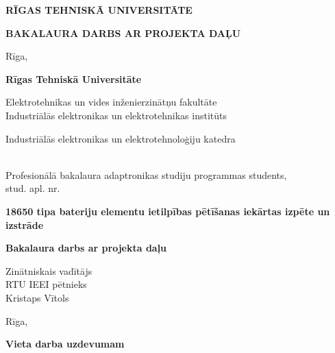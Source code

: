 \documentclass[12pt,fleqn,titlepage,oneside]{article}
\begin{document}
\begin{titlepage}
	\centering
	\doublespacing
	
	{\Large\MakeUppercase{\textbf{Rīgas Tehniskā Universitāte}}\par}
	
	\vspace*{\fill}
	
	{\Huge\MakeUppercase{\textbf{Bakalaura darbs ar projekta daļu}}\par}
	
	\vspace*{\fill}
	
	{\Large Rīga, \the\year}
\end{titlepage}

\begin{titlepage}
	\centering
	\doublespacing
	{\Large \textbf{Rīgas Tehniskā Universitāte}}
	
	{Elektrotehnikas un vides inženierzinātņu fakultāte\\}
	{Industriālās elektronikas un elektrotehnikas institūts\\}
	{Industriālās elektronikas un elektrotehnoloģiju katedra\par}
	\vspace{2cm}
	
	\onehalfspacing
	{\Large \textbf{\authorName}\\}
	Profesionālā bakalaura adaptronikas studiju programmas students,\\
	stud. apl. nr. \authorId
	\vspace{2cm}
	
	{\huge \textbf{18650 tipa bateriju elementu ietilpības pētīšanas iekārtas izpēte un izstrāde}\par}
	
	\doublespacing
	{\Large\textbf{Bakalaura darbs ar projekta daļu}\par}
	\onehalfspacing
	\vspace{6cm}
	
	\raggedleft
	Zinātniskais vadītājs\\
	RTU IEEI pētnieks\\
	\doublespacing
	{\Large Kristaps Vītols}
	
	\centering
	\vfill
	Rīga, \the\year
\end{titlepage}

\begin{titlepage}
	\centering
	\vspace*{\fill}
	{\Large\textbf{Vieta darba uzdevumam}}
	\vspace*{\fill}
\end{titlepage}
\end{document}
